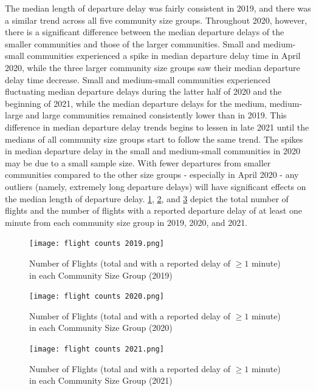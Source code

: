 \documentclass[11pt]{article}
\begin{document}
The median length of departure delay was fairly consistent in 2019, and there was a similar trend across all five community size groups. Throughout 2020, however, there is a significant difference between the median departure delays of the smaller communities and those of the larger communities. Small and medium-small communities experienced a spike in median departure delay time in April 2020, while the three larger community size groups saw their median departure delay time decrease. Small and medium-small communities experienced fluctuating median departure delays during the latter half of 2020 and the beginning of 2021, while the median departure delays for the medium, medium-large and large communities remained consistently lower than in 2019. This difference in median departure delay trends begins to lessen in late 2021 until the medians of all community size groups start to follow the same trend.  
\-\hspace{0.5cm} The spikes in median departure delay in the small and medium-small communities in 2020 may be due to a small sample size. With fewer departures from smaller communities compared to the other size groups - especially in April 2020 - any outliers (namely, extremely long departure delays) will have significant effects on the median length of departure delay. \cref{flight_counts_2019},  \cref{flight_counts_2020}, and \cref{flight_counts_2021} depict the total number of flights and the number of flights with a reported departure delay of at least one minute from each community size group in 2019, 2020, and 2021. 

\begin{figure}[htbp!]
\centerline{\texttt{[image: flight counts 2019.png]}}
\caption{Number of Flights (total and with a reported delay of  $\geq 1$ minute) in each Community Size Group (2019)}
\label{flight_counts_2019}
\end{figure}

\begin{figure}[htbp!]
\centerline{\texttt{[image: flight counts 2020.png]}}
\caption{Number of Flights (total and with a reported delay of  $\geq 1$ minute) in each Community Size Group (2020)}
\label{flight_counts_2020}
\end{figure}

\newpage

\begin{figure}[htbp!]
\centerline{\texttt{[image: flight counts 2021.png]}}
\caption{Number of Flights (total and with a reported delay of  $\geq 1$ minute) in each Community Size Group (2021)}
\label{flight_counts_2021}
\end{figure}
\end{document}
